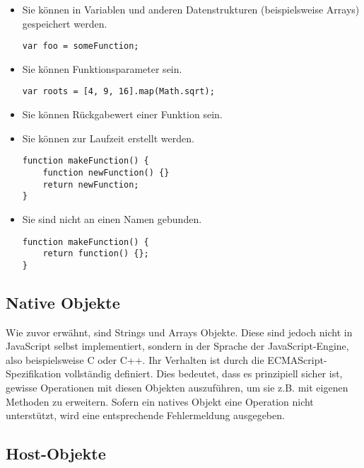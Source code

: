 \begin{itemize}
\item Sie können in Variablen und anderen Datenstrukturen (beispielsweise Arrays) gespeichert
werden.
\begin{lstlisting}[caption=Zuweisung einer Funktion an eine Variable]
var foo = someFunction;
\end{lstlisting}

\item Sie können Funktionsparameter sein.
\begin{lstlisting}[caption=Erstellen einer neuen Liste mittels einer Transformationsfunktion]
var roots = [4, 9, 16].map(Math.sqrt);
\end{lstlisting}

\item Sie können Rückgabewert einer Funktion sein.

\item Sie können zur Laufzeit erstellt werden.
\begin{lstlisting}[caption=Eine Funktion\, die eine neue Funktion erstellt und zurückgibt]
function makeFunction() {
    function newFunction() {}
    return newFunction;
}
\end{lstlisting}

\item Sie sind nicht an einen Namen gebunden.
\begin{lstlisting}[caption=Erstellen einer anonymen Funktion]
function makeFunction() {
    return function() {};
}
\end{lstlisting}
\end{itemize}


\subsection{Native Objekte}
Wie zuvor erwähnt, sind Strings und Arrays Objekte. Diese sind jedoch nicht in
JavaScript selbst implementiert, sondern in der Sprache der JavaScript-Engine, also beispielsweise C
oder C++. Ihr Verhalten ist durch die ECMAScript-Spezifikation \citep{ecmascript} vollständig
definiert. Dies bedeutet, dass es prinzipiell sicher ist, gewisse Operationen mit
diesen Objekten auszuführen, um sie z.B. mit eigenen Methoden zu erweitern. Sofern ein natives
Objekt eine Operation nicht unterstützt, wird eine entsprechende Fehlermeldung ausgegeben.



\subsection{Host-Objekte}

